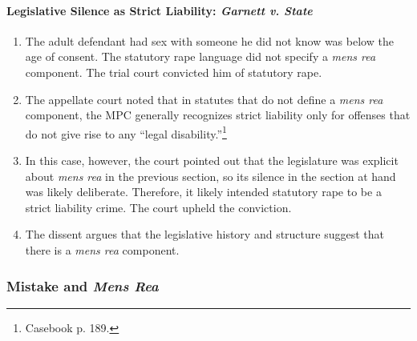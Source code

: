 \paragraph{Legislative Silence as Strict Liability: \emph{Garnett v. State}}

\begin{enumerate}
    \item The adult defendant had sex with someone he did not know was below the age of consent. The statutory rape language did not specify a \emph{mens rea} component. The trial court convicted him of statutory rape.
    \item The appellate court noted that in statutes that do not define a \emph{mens rea} component, the MPC generally recognizes strict liability only for offenses that do not give rise to any ``legal disability.''\footnote{Casebook p. 189.}
    \item In this case, however, the court pointed out that the legislature was explicit about \emph{mens rea} in the previous section, so its silence in the section at hand was likely deliberate. Therefore, it likely intended statutory rape to be a strict liability crime. The court upheld the conviction.
    \item The dissent argues that the legislative history and structure suggest that there is a \emph{mens rea} component.
\end{enumerate}

\subsubsection{Mistake and \emph{Mens Rea}}


